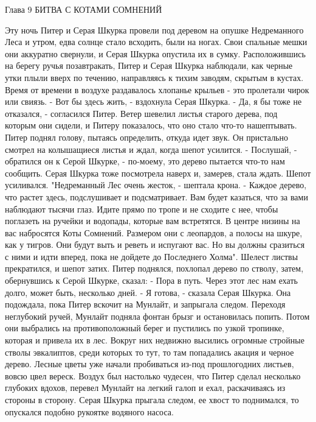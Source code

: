         Глава 9
        БИТВА С КОТАМИ СОМНЕНИЙ

    Эту ночь Питер и Серая Шкурка провели под деревом на опушке 
Недреманного Леса и утром, едва солнце стало всходить, были на ногах. 
Свои спальные мешки они аккуратно свернули, и Серая Шкурка опустила их 
в сумку. Расположившись на берегу ручья позавтракать, Питер и Серая 
Шкурка наблюдали, как черные утки плыли вверх по течению, направляясь 
к тихим заводям, скрытым в кустах. Время от времени в воздухе 
раздавалось хлопанье крыльев - это пролетали чирок или свиязь.
    - Вот бы здесь жить, - вздохнула Серая Шкурка.
    - Да, я бы тоже не отказался, - согласился Питер.
    Ветер шевелил листья старого дерева, под которым они сидели, и 
Питеру показалось, что оно стало что-то нашептывать. Питер поднял 
голову, пытаясь определить, откуда идет звук. Он пристально смотрел на 
колышащиеся листья и ждал, когда шепот усилится.
    - Послушай, - обратился он к Серой Шкурке, - по-моему, это дерево 
пытается что-то нам сообщить.
    Серая Шкурка тоже посмотрела наверх и, замерев, стала ждать.
    Шепот усиливался.
    "Недреманный Лес очень жесток, - шептала крона. - Каждое дерево, 
что растет здесь, подслушивает и подсматривает. Вам будет казаться, 
что за вами наблюдают тысячи глаз. Идите прямо по тропе и не сходите с 
нее, чтобы поглазеть на ручейки и водопады, которые вам встретятся. В 
центре низины на вас набросятся Коты Сомнений. Размером они с 
леопардов, а полосы на шкуре, как у тигров. Они будут выть и реветь и 
испугают вас. Но вы должны сразиться с ними и идти вперед, пока не 
дойдете до Последнего Холма".
    Шелест листвы прекратился, и шепот затих. Питер поднялся, похлопал 
дерево по стволу, затем, обернувшись к Серой Шкурке, сказал:
    - Пора в путь. Через этот лес нам ехать долго, может быть, 
несколько дней.
    - Я готова, - сказала Серая Шкурка. Она подождала, пока Питер 
вскочит на Мунлайт, и запрыгала следом. Переходя неглубокий ручей, 
Мунлайт подняла фонтан брызг и остановилась попить. Потом они 
выбрались на противоположный берег и пустились по узкой тропинке, 
которая и привела их в лес.
    Вокруг них недвижно высились огромные стройные стволы эвкалиптов, 
среди которых то тут, то там попадались акация и черное дерево. Лесные 
цветы уже начали пробиваться из-под прошлогодних листьев, вовсю цвел 
вереск. Воздух был настолько чудесен, что Питер сделал несколько 
глубоких вдохов, перевел Мунлайт на легкий галоп и ехал, раскачиваясь 
из стороны в сторону. Серая Шкурка прыгала следом, ее хвост то 
поднимался, то опускался подобно рукоятке водяного насоса.

